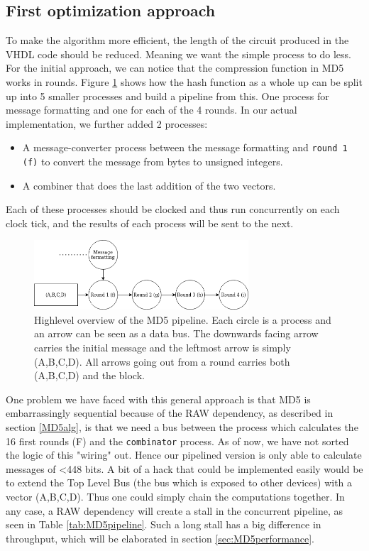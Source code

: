 \documentclass[a4paper, openany]{book}
\begin{document}
\begin{abstact}
\subsection{First optimization approach}
\label{sec:org03c6778}
To make the algorithm more efficient, the length of the circuit produced in the VHDL code should be reduced. Meaning we want the simple process to do less. For the initial approach, we can notice that the compression function in MD5 works in rounds. Figure \ref{fig:MD5opt1} shows how the hash function as a whole up can be split up into 5 smaller processes and build a pipeline from this. One process for message formatting and one for each of the 4 rounds. In our actual implementation, we further added 2 processes:
\begin{itemize}
\item A message-converter process between the message formatting and \texttt{round 1 (f)} to convert the message from bytes to unsigned integers.
\item A combiner that does the last addition of the two vectors.
\end{itemize}
Each of these processes should be clocked and thus run concurrently on each clock tick, and the results of each process will be sent to the next.
\begin{figure}[H]
\centering
\includegraphics[width=8cm]{md5.png}
\caption[Pipeline MD5]{Highlevel overview of the MD5 pipeline. Each circle is a process and an arrow can be seen as a data bus. The downwards facing arrow carries the initial message and the leftmost arrow is simply (A,B,C,D). All arrows going out from a round carries both (A,B,C,D) and the block.}
\label{fig:MD5opt1}
\end{figure}
One problem we have faced with this general approach is that MD5 is embarrassingly sequential because of the RAW dependency, as described in section \ref{MD5alg}, is that we need a bus between the process which calculates the 16 first rounds (F) and the \texttt{combinator} process. As of now, we have not sorted the logic of this "wiring" out. Hence our pipelined version is only able to calculate messages of <448 bits. A bit of a hack that could be implemented easily would be to extend the Top Level Bus (the bus which is exposed to other devices) with a vector (A,B,C,D). Thus one could simply chain the computations together. In any case, a RAW dependency will create a stall in the concurrent pipeline, as seen in Table \ref{tab:MD5pipeline}. Such a long stall has a big difference in throughput, which will be elaborated in section \ref{sec:MD5performance}.


\end{abstact}
\end{document}
